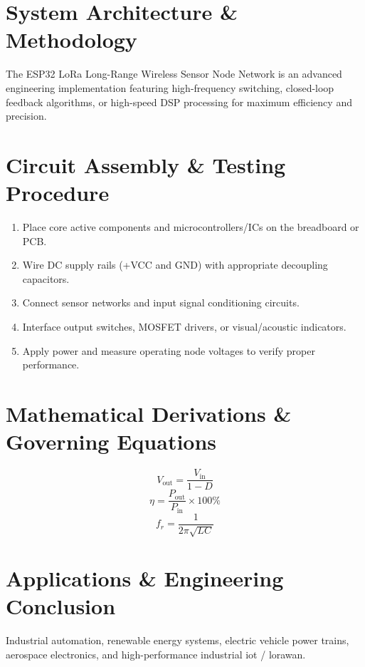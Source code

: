 \documentclass[11pt,a4paper]{article}
\begin{document}
\section{System Architecture \& Methodology}
The ESP32 LoRa Long-Range Wireless Sensor Node Network is an advanced engineering implementation featuring high-frequency switching, closed-loop feedback algorithms, or high-speed DSP processing for maximum efficiency and precision.

\section{Circuit Assembly \& Testing Procedure}
\begin{enumerate}
    \item Place core active components and microcontrollers/ICs on the breadboard or PCB.
    \item Wire DC supply rails (+VCC and GND) with appropriate decoupling capacitors.
    \item Connect sensor networks and input signal conditioning circuits.
    \item Interface output switches, MOSFET drivers, or visual/acoustic indicators.
    \item Apply power and measure operating node voltages to verify proper performance.
\end{enumerate}

\section{Mathematical Derivations \& Governing Equations}
\begin{equation}
V_{\text{out}} = \frac{V_{\text{in}}}{1 - D}
\end{equation}
\begin{equation}
\eta = \frac{P_{\text{out}}}{P_{\text{in}}} \times 100\%
\end{equation}
\begin{equation}
f_r = \frac{1}{2\pi \sqrt{L C}}
\end{equation}

\section{Applications \& Engineering Conclusion}
Industrial automation, renewable energy systems, electric vehicle power trains, aerospace electronics, and high-performance industrial iot / lorawan.
\end{document}
